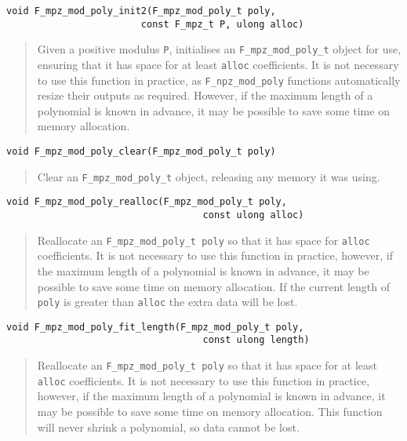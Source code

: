 \documentclass[a4paper,10pt]{article}
\newcommand{\code}{\lstinline}
\begin{document}
\begin{lstlisting}
void F_mpz_mod_poly_init2(F_mpz_mod_poly_t poly, 
                        const F_mpz_t P, ulong alloc)
\end{lstlisting}
\begin{quote}
Given a positive modulus \code{P}, initialises an \code{F_mpz_mod_poly_t} object for use, ensuring that it
has space for at least \code{alloc} coefficients. It is not necessary to use this function in practice, as
\code{F_npz_mod_poly} functions automatically resize their outputs as required. However, if the maximum
length of a polynomial is known in advance, it may be possible to save some time on memory allocation.
\end{quote}

\begin{lstlisting}
void F_mpz_mod_poly_clear(F_mpz_mod_poly_t poly)
\end{lstlisting}
\begin{quote}
Clear an \code{F_mpz_mod_poly_t} object, releasing any memory it was using.
\end{quote}

\begin{lstlisting}
void F_mpz_mod_poly_realloc(F_mpz_mod_poly_t poly, 
                                   const ulong alloc)
\end{lstlisting}
\begin{quote}
Reallocate an \code{F_mpz_mod_poly_t poly} so that it has space for \code{alloc} coefficients. It is not 
necessary to use this function in practice, however, if the maximum length of a polynomial is known in 
advance, it may be possible to save some time on memory allocation. If the current length of \code{poly}
is greater than \code{alloc} the extra data will be lost.
\end{quote}

\begin{lstlisting}
void F_mpz_mod_poly_fit_length(F_mpz_mod_poly_t poly, 
                                   const ulong length)
\end{lstlisting}
\begin{quote}
Reallocate an \code{F_mpz_mod_poly_t poly} so that it has space for at least \code{alloc} coefficients. 
It is not necessary to use this function in practice, however, if the maximum length of a polynomial is 
known in advance, it may be possible to save some time on memory allocation. This function will never 
shrink a polynomial, so data cannot be lost.
\end{quote}
\end{document}
